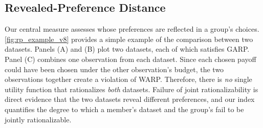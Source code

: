 \documentclass[11 pt]{article}
\begin{document}

\subsection{Revealed-Preference Distance}\label{subsec:rpd}

Our central measure assesses whose preferences are reflected in a group's choices. \autoref{fig:rp_example_v8} provides a simple example of the comparison between two datasets. Panels (A) and (B) plot two datasets, each of which satisfies GARP. Panel (C) combines one observation from each dataset. Since each chosen payoff could have been chosen under the other observation's budget, the two observations together create a violation of WARP. Therefore, there is \emph{no} single utility function that rationalizes \emph{both} datasets. Failure of joint rationalizability is direct evidence that the two datasets reveal different preferences, and our index quantifies the degree to which a member's dataset and the group's fail to be jointly rationalizable.
\end{document}
